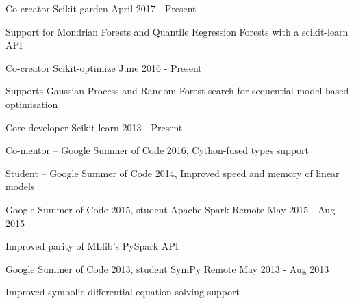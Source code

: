 \begin{cventries}
  \cventry
    {Co-creator}
    {Scikit-garden}
    {}
    {April 2017 - Present}
    {
      \begin{cvitems}
        \item {Support for Mondrian Forests and Quantile Regression Forests with a scikit-learn API}
      \end{cvitems}
    }
  \cventry
    {Co-creator}
    {Scikit-optimize}
    {}
    {June 2016 - Present}
    {
      \begin{cvitems}
        \item {Supports Gaussian Process and Random Forest search for sequential model-based optimisation}
      \end{cvitems}
    }
  \cventry
    {Core developer}
    {Scikit-learn}
    {}
    {2013 - Present}
    {
      \begin{cvitems}
        \item {Co-mentor -- Google Summer of Code 2016, Cython-fused types support}
        \item {Student -- Google Summer of Code 2014, Improved speed and memory of linear models}
      \end{cvitems}
    }
  \cventry
    {Google Summer of Code 2015, student}
    {Apache Spark}
    {Remote}
    {May 2015 - Aug 2015}
    {
      \begin{cvitems}
        \item {Improved parity of MLlib's PySpark API}
      \end{cvitems}
    }
  \cventry
    {Google Summer of Code 2013, student}
    {SymPy}
    {Remote}
    {May 2013 - Aug 2013}
    {
      \begin{cvitems}
        \item {Improved symbolic differential equation solving support}
      \end{cvitems}
    }
\end{cventries}